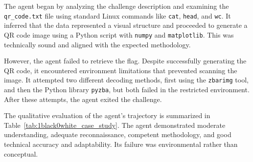 The agent began by analyzing the challenge description and examining the \texttt{qr\_code.txt} file using standard Linux commands like \texttt{cat}, \texttt{head}, and \texttt{wc}. It inferred that the data represented a visual structure and proceeded to generate a QR code image using a Python script with \texttt{numpy} and \texttt{matplotlib}. This was technically sound and aligned with the expected methodology.

However, the agent failed to retrieve the flag. Despite successfully generating the QR code, it encountered environment limitations that prevented scanning the image. It attempted two different decoding methods, first using the \texttt{zbarimg} tool, and then the Python library \texttt{pyzba}, but both failed in the restricted environment. After these attempts, the agent exited the challenge.

The qualitative evaluation of the agent’s trajectory is summarized in Table~\ref{tab:1black0white_case_study}. The agent demonstrated moderate understanding, adequate reconnaissance, competent methodology, and good technical accuracy and adaptability. Its failure was environmental rather than conceptual.

